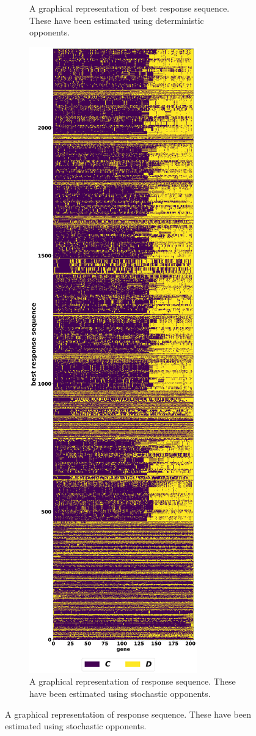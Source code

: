 \begin{figure}[!htbp]
\begin{subfigure}{0.45\textwidth}
    \caption{A graphical representation of best \deterministicsequences response sequence. These
    have been estimated using deterministic opponents.}\label{fig:brs_visualisation}
    \end{subfigure}\hfill
    \begin{subfigure}{0.45\textwidth}
    \centering
    \includegraphics[width=.9\textwidth]{src/chapters/06/img/stochastic_best_responses.pdf}
    \caption{A graphical representation of \stochasticsequences response sequence. These
    have been estimated using stochastic opponents.}\label{fig:brs_visualisation_stochastic}
    \end{subfigure}
\end{figure}

